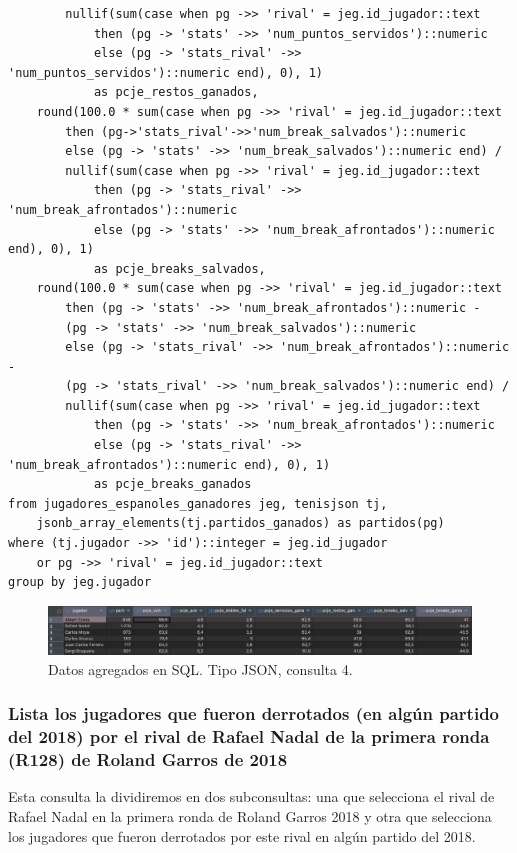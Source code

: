 \begin{verbatim}
    	nullif(sum(case when pg ->> 'rival' = jeg.id_jugador::text 
    		then (pg -> 'stats' ->> 'num_puntos_servidos')::numeric 
    		else (pg -> 'stats_rival' ->> 'num_puntos_servidos')::numeric end), 0), 1) 
			as pcje_restos_ganados,
    round(100.0 * sum(case when pg ->> 'rival' = jeg.id_jugador::text 
    	then (pg->'stats_rival'->>'num_break_salvados')::numeric 
    	else (pg -> 'stats' ->> 'num_break_salvados')::numeric end) / 
    	nullif(sum(case when pg ->> 'rival' = jeg.id_jugador::text 
    		then (pg -> 'stats_rival' ->> 'num_break_afrontados')::numeric 
    		else (pg -> 'stats' ->> 'num_break_afrontados')::numeric end), 0), 1) 
			as pcje_breaks_salvados,
    round(100.0 * sum(case when pg ->> 'rival' = jeg.id_jugador::text 
    	then (pg -> 'stats' ->> 'num_break_afrontados')::numeric - 
		(pg -> 'stats' ->> 'num_break_salvados')::numeric
    	else (pg -> 'stats_rival' ->> 'num_break_afrontados')::numeric - 
		(pg -> 'stats_rival' ->> 'num_break_salvados')::numeric end) / 
    	nullif(sum(case when pg ->> 'rival' = jeg.id_jugador::text 
    		then (pg -> 'stats' ->> 'num_break_afrontados')::numeric 
    		else (pg -> 'stats_rival' ->> 'num_break_afrontados')::numeric end), 0), 1) 
			as pcje_breaks_ganados
from jugadores_espanoles_ganadores jeg, tenisjson tj, 
	jsonb_array_elements(tj.partidos_ganados) as partidos(pg)
where (tj.jugador ->> 'id')::integer = jeg.id_jugador 
	or pg ->> 'rival' = jeg.id_jugador::text
group by jeg.jugador
\end{verbatim}


\begin{figure}[H]
\centering
\includegraphics[width=\textwidth]{fotos/q4_json.png}
\caption{Datos agregados en SQL. Tipo JSON, consulta 4.}
\label{fig:q4_json}
\end{figure}


\subsubsection{Lista los jugadores que fueron derrotados (en algún partido del 2018) por el rival de Rafael Nadal de la primera ronda (R128) de Roland Garros de 2018}

Esta consulta la dividiremos en dos subconsultas: una que selecciona el rival de Rafael Nadal en la primera ronda de Roland Garros 2018 y otra que selecciona los jugadores que fueron derrotados por este rival en algún partido del 2018. \\

